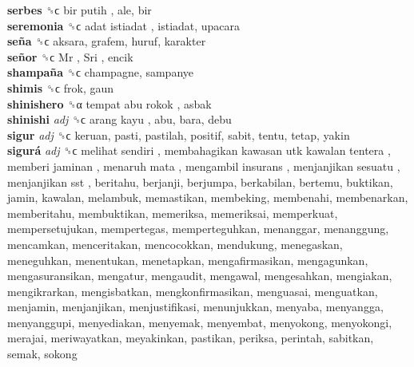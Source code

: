 \textbf{serbes} ␝ϲ   bir putih , ale, bir  \\
\textbf{seremonia} ␝ϲ   adat istiadat , istiadat, upacara  \\
\textbf{seña} ␝ϲ  aksara, grafem, huruf, karakter  \\
\textbf{señor} ␝ϲ   Mr ,  Sri , encik  \\
\textbf{shampaña} ␝ϲ  champagne, sampanye  \\
\textbf{shimis} ␝ϲ  frok, gaun  \\
\textbf{shinishero} ␝α   tempat abu rokok , asbak  \\
\textbf{shinishi} \emph{adj}  ␝ϲ   arang kayu , abu, bara, debu  \\
\textbf{sigur} \emph{adj}  ␝ϲ  keruan, pasti, pastilah, positif, sabit, tentu, tetap, yakin  \\
\textbf{sigurá} \emph{adj}  ␝ϲ   melihat sendiri ,  membahagikan kawasan utk kawalan tentera ,  memberi jaminan ,  menaruh mata ,  mengambil insurans ,  menjanjikan sesuatu ,  menjanjikan sst , beritahu, berjanji, berjumpa, berkabilan, bertemu, buktikan, jamin, kawalan, melambuk, memastikan, membeking, membenahi, membenarkan, memberitahu, membuktikan, memeriksa, memeriksai, memperkuat, mempersetujukan, mempertegas, memperteguhkan, menanggar, menanggung, mencamkan, menceritakan, mencocokkan, mendukung, menegaskan, meneguhkan, menentukan, menetapkan, mengafirmasikan, mengagunkan, mengasuransikan, mengatur, mengaudit, mengawal, mengesahkan, mengiakan, mengikrarkan, mengisbatkan, mengkonfirmasikan, menguasai, menguatkan, menjamin, menjanjikan, menjustifikasi, menunjukkan, menyaba, menyangga, menyanggupi, menyediakan, menyemak, menyembat, menyokong, menyokongi, merajai, meriwayatkan, meyakinkan, pastikan, periksa, perintah, sabitkan, semak, sokong  \\
